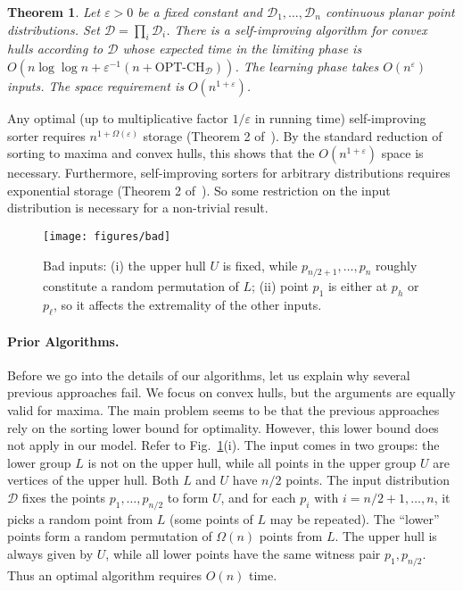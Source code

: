 \documentclass[letterpaper,11pt]{article}
\newtheorem{theorem}{Theorem}[section]
\newcommand{\eps}{\varepsilon}
\newcommand{\OPTCH}{\text{OPT-CH}}
\newcommand{\cD}{\mathcal{D}}
\begin{document}
\begin{theorem}\label{thm:main-ch} 
  Let $\eps > 0$ be a fixed constant 
  and $\cD_1, \ldots, \cD_n$ 
  continuous planar point distributions. 
  Set $\cD = \prod_i \cD_i$. There is a 
  self-improving algorithm for convex hulls
  according to $\cD$ whose expected time in 
  the limiting phase is 
  $O(n\log\log n + \eps^{-1}(n + \OPTCH_\cD))$. 
  The learning phase takes $O(n^\eps)$ inputs. 
  The space requirement is $O(n^{1+\eps})$.
\end{theorem}

Any optimal (up to multiplicative factor $1/\eps$ in running time)
self-improving sorter requires $n^{1+\Omega(\eps)}$ storage (Theorem 2 of~\cite{AilonCCLMS11}).
By the standard reduction of sorting to maxima and convex hulls, this shows that 
the $O(n^{1+\eps})$ space is necessary.
Furthermore, self-improving sorters for arbitrary distributions requires exponential storage (Theorem 2 of~\cite{AilonCCLMS11}). So some 
restriction on the input distribution is necessary for a non-trivial result.

\begin{figure}
  \centering
  \texttt{[image: figures/bad]}

  \caption{Bad inputs: (i) the 
    upper hull $U$ is fixed, while 
    $p_{n/2 +1}, \ldots, p_n$ roughly 
    constitute a random permutation of $L$; 
    (ii) point $p_1$ is either at $p_h$ 
    or $p_\ell$, so it affects the 
    extremality of the other inputs.}
  \label{fig:bad}
\end{figure}

\paragraph{Prior Algorithms.}
Before we go into the details of
our algorithms, let us explain why
several previous approaches fail.
We focus 
on convex hulls, but the arguments
are equally valid for maxima.
The main problem seems to be
that the previous approaches rely
on the sorting lower bound for 
optimality. However, this 
lower bound does not apply 
in our model.  Refer to 
Fig.~\ref{fig:bad}(i). 
The input comes in two groups: 
the lower group $L$ is not on 
the upper hull, while all points
in the upper group $U$
are vertices of the upper hull. 
Both $L$ and $U$ have
$n/2$ points. The input distribution 
$\cD$ fixes the points 
$p_1, \dots, p_{n/2}$ to form $U$, 
and for each $p_i$ with $i = n/2+1, \dots, n$, 
it picks a random point from $L$ 
(some points of $L$ may be repeated). 
The ``lower'' points form a random 
permutation of $\Omega(n)$ points from $L$. 
The upper hull is always given by $U$, 
while all lower points have the same
witness pair $p_1, p_{n/2}$. Thus 
an optimal algorithm requires $O(n)$ time.
\end{document}
